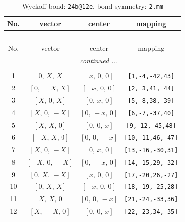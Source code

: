 \documentclass[fleqn,8pt]{jsarticle}
\begin{document}
\begin{longtable}{cccc}
\caption{Wyckoff bond: {\tt 24b@12e}, bond symmetry: {\tt 2.mm}}
 \\
 \hline \hline
No. & vector & center & mapping \\ \hline \endfirsthead

\multicolumn{3}{l}{\tablename\ \thetable{}} \\
 \hline \hline
No. & vector & center & mapping \\ \hline \endhead

 \hline \hline
\multicolumn{3}{r}{\footnotesize\it continued ...} \\ \endfoot

 \hline \hline
\multicolumn{3}{r}{} \\ \endlastfoot

1 & $\left[ 0,\, X,\, X \right]$ & $\left[ x,\, 0,\, 0 \right]$ & {\tt [1,-4,-42,43]} \\ \hline
2 & $\left[ 0,\, - X,\, X \right]$ & $\left[ - x,\, 0,\, 0 \right]$ & {\tt [2,-3,41,-44]} \\ \hline
3 & $\left[ X,\, 0,\, X \right]$ & $\left[ 0,\, x,\, 0 \right]$ & {\tt [5,-8,38,-39]} \\ \hline
4 & $\left[ X,\, 0,\, - X \right]$ & $\left[ 0,\, - x,\, 0 \right]$ & {\tt [6,-7,-37,40]} \\ \hline
5 & $\left[ X,\, X,\, 0 \right]$ & $\left[ 0,\, 0,\, x \right]$ & {\tt [9,-12,-45,48]} \\ \hline
6 & $\left[ - X,\, X,\, 0 \right]$ & $\left[ 0,\, 0,\, - x \right]$ & {\tt [10,-11,46,-47]} \\ \hline
7 & $\left[ X,\, 0,\, - X \right]$ & $\left[ 0,\, x,\, 0 \right]$ & {\tt [13,-16,-30,31]} \\ \hline
8 & $\left[ - X,\, 0,\, - X \right]$ & $\left[ 0,\, - x,\, 0 \right]$ & {\tt [14,-15,29,-32]} \\ \hline
9 & $\left[ 0,\, X,\, - X \right]$ & $\left[ x,\, 0,\, 0 \right]$ & {\tt [17,-20,26,-27]} \\ \hline
10 & $\left[ 0,\, X,\, X \right]$ & $\left[ - x,\, 0,\, 0 \right]$ & {\tt [18,-19,-25,28]} \\ \hline
11 & $\left[ X,\, X,\, 0 \right]$ & $\left[ 0,\, 0,\, - x \right]$ & {\tt [21,-24,-33,36]} \\ \hline
12 & $\left[ X,\, - X,\, 0 \right]$ & $\left[ 0,\, 0,\, x \right]$ & {\tt [22,-23,34,-35]} \\
\end{longtable}
\renewcommand{\arraystretch}{1.2}
\end{document}
